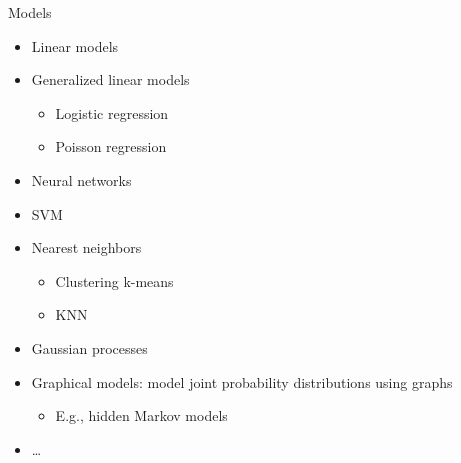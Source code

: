 \documentclass[aspectratio=169, xcolor=dvipsnames]{beamer}
\begin{document}
  \begin{frame}{Models}
    \begin{itemize}
      \item Linear models

      \item Generalized linear models
        \begin{itemize}
          \item Logistic regression

          \item Poisson regression
        \end{itemize}

      \item Neural networks

      \item SVM

      \item Nearest neighbors
        \begin{itemize}
          \item Clustering k-means

          \item KNN
        \end{itemize}

      \item Gaussian processes

      \item Graphical models: model joint probability distributions using graphs
        \begin{itemize}
          \item E.g., hidden Markov models
        \end{itemize}

      \item \ldots{}
    \end{itemize}
  \end{frame}
\end{document}

